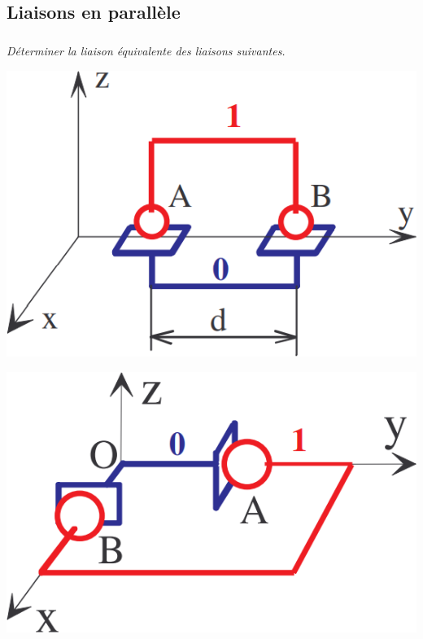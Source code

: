 \documentclass[10pt,fleqn]{article} %
\begin{document}
\def\pathfig{images}

\vspace{4.5cm}
\pagestyle{fancy}
\thispagestyle{plain}

\def\columnseprulecolor{\color{ocre}}
\setlength{\columnseprule}{0.4pt} 

\def\pathfig{images}


\ifprof
\begin{multicols}{2}
\else
\begin{multicols}{2}
\fi


\subsection*{Liaisons en parallèle}

\subparagraph{}
\textit{Déterminer la liaison équivalente des liaisons suivantes.}

\begin{center}
\includegraphics[width=.8\linewidth]{images/fig_01.png}
\end{center}

\begin{center}
\includegraphics[width=.8\linewidth]{images/fig_02.png}
\end{center}


\end{multicols}
\end{multicols}
\end{document}
